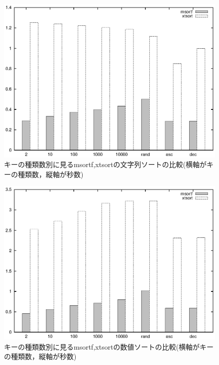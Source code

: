 \begin{figure}[!hbt]
\begin{center}
\includegraphics[scale=.8]{figure/msortf/key.eps}
\end{center}
\caption{キーの種類数別に見るmsortf,xtsortの文字列ソートの比較(横軸がキーの種類数，縦軸が秒数)\label{fig:msortf:bench1}}
\end{figure}

\begin{figure}[!hbt]
\begin{center}
\includegraphics[scale=.8]{figure/msortf/num.eps}
\end{center}
\caption{キーの種類数別に見るmsortf,xtsortの数値ソートの比較(横軸がキーの種類数，縦軸が秒数)\label{fig:msortf:bench2}}
\end{figure}

